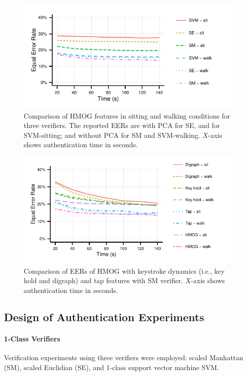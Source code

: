 \documentclass{article}
\begin{document}
\begin{figure}[t]
  \includegraphics[width=1\linewidth]{plots_R/auth_hmog_all_verifiers_new.pdf}
  \caption[]{Comparison of HMOG features in sitting and walking conditions for three verifiers. The reported EERs are with PCA for SE, and for SVM-sitting; and without PCA for SM and SVM-walking. $X$-axis shows authentication time in seconds.}
  \label{fig:hmogAllVerifiersSitWalk}
\end{figure}
  
\begin{figure}[t]
  \includegraphics[width=1\linewidth]{plots_R/auth_compare_all_single.pdf}
  \caption[]{Comparison of EERs of HMOG with keystroke dynamics (i.e., key hold and digraph) and tap features with SM verifier. $X$-axis shows authentication time in seconds.} %
  \label{fig:walkVSsitAllSM}
\end{figure}

\subsection{Design of Authentication Experiments} \label{authenticationExperiments}

\paragraph{1-Class Verifiers} Verification experiments using three verifiers were employed: scaled Manhattan (SM), scaled Euclidian (SE), and 1-class support vector machine SVM.
\end{document}
